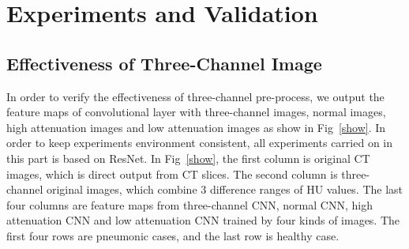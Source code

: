 \documentclass[runningheads]{llncs}
\begin{document}
\begin{table}[htb]
    \vspace{-0cm}
    \caption{Comparison between Training from Scratch and Training with Pre-trained Weights}
    \vspace{-0cm}
    \begin{center}
    \vspace{-0cm}
    \label{pretrain}
    \end{center}
    \vspace{-0cm}
    \end{table}


\section{Experiments and Validation}
\label{expandres}
\subsection{Effectiveness of Three-Channel Image}
\label{effectiveness}
In order to verify the effectiveness of three-channel pre-process, we output the feature maps of convolutional layer with three-channel images, normal images, high attenuation images and low attenuation images as show in Fig~\ref{show}. In order to keep experiments environment consistent, all experiments carried on in this part is based on ResNet. In Fig~\ref{show}, the first column is original CT images, which is direct output from CT slices. The second column is three-channel original images, which combine 3 difference ranges of HU values. The last four columns are feature maps from three-channel CNN, normal CNN, high attenuation CNN and low attenuation CNN trained by four kinds of images. The first four rows are pneumonic cases, and the last row is healthy case.
\end{document}
